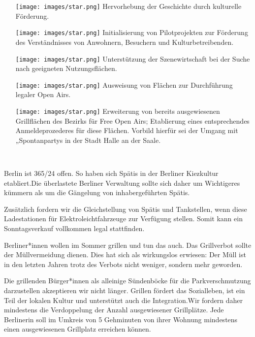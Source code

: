\documentclass[a4paper,10pt]{article}
\newcommand{\mysection}[1]{{\vspace{1cm}\noindent\color{gray}{\ttfamily\LARGE\raggedright #1}\\\medskip}}
\newcommand{\abschnitt}[2]{%
\mysection{\raggedright #1}%
\begin{figure}[t]%
\vspace*{-2.7cm}%
\hspace*{-2.1cm}%
\texttt{[image: images/blog/small/\#2]} %
\end{figure}%
}
\newcommand{\querschlaeger}[1]{
\begin{figure}[t]%
\vspace*{-2.7cm}%
\hspace*{-2.1cm}%
\texttt{[image: images/blog/small/\#1]} %
\end{figure}%
}
\begin{document}
\begin{itemize}
\itemsep1pt\parskip0pt
\item[\texttt{[image: images/star.png]}]
  Hervorhebung der Geschichte durch kulturelle Förderung.
\item[\texttt{[image: images/star.png]}]
  Initialisierung von Pilotprojekten zur Förderung des Verständnisses
  von Anwohnern, Besuchern und Kulturbetreibenden.
\item[\texttt{[image: images/star.png]}]
  Unterstützung der Szenewirtschaft bei der Suche nach geeigneten
  Nutzungsflächen.
\item[\texttt{[image: images/star.png]}]
  Ausweisung von Flächen zur Durchführung legaler Open Airs.
\item[\texttt{[image: images/star.png]}]
  Erweiterung von bereits ausgewiesenen Grillflächen des Bezirks für
  Free Open Airs; Etablierung eines entsprechendes Anmeldeprozederes für
  diese Flächen. Vorbild hierfür sei der Umgang mit „Spontanpartys{\grqq} in
  der Stadt Halle an der Saale.
\end{itemize}

\mysection{Kiezleben}

Berlin ist 365/24 offen. So haben sich Spätis in der Berliner Kiezkultur
etabliert.Die überlastete Berliner Verwaltung sollte sich daher um
Wichtigeres kümmern als um die Gängelung von inhabergeführten Spätis.

Zusätzlich fordern wir die Gleichstellung von Spätis und Tankstellen,
wenn diese Ladestationen für Elektroleichtfahrzeuge zur Verfügung
stellen. Somit kann ein Sonntagsverkauf vollkommen legal stattfinden.

Berliner*innen wollen im Sommer grillen und tun das auch. Das
Grillverbot sollte der Müllvermeidung dienen. Dies hat sich als
wirkungslos erwiesen: Der Müll ist in den letzten Jahren trotz des
Verbots nicht weniger, sondern mehr geworden.

Die grillenden Bürger*innen als alleinige Sündenböcke für die
Parkverschmutzung darzustellen akzeptieren wir nicht länger. Grillen
fördert das Sozialleben, ist ein Teil der lokalen Kultur und unterstützt
auch die Integration.Wir fordern daher mindestens die Verdoppelung der
Anzahl ausgewiesener Grillplätze. Jede Berlinerin soll im Umkreis von 5
Gehminuten von ihrer Wohnung mindestens einen ausgewiesenen Grillplatz
erreichen können.

\mysection{Sucht-{\raisebox{-.5cm}{~}} und Drogenpolitik}
\end{document}
